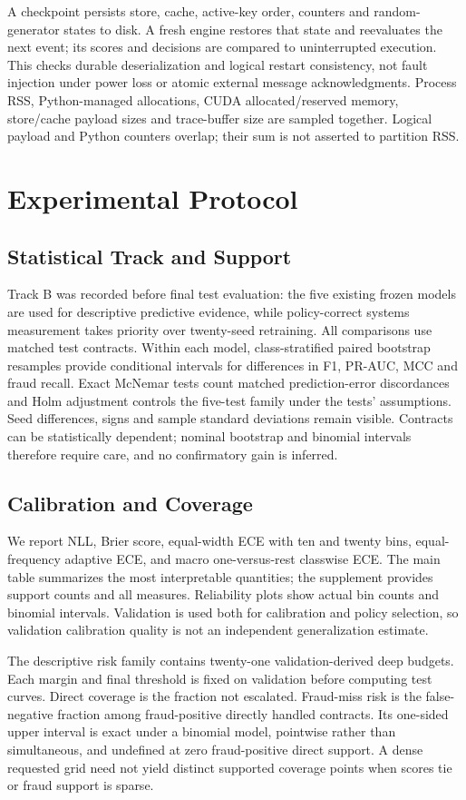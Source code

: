 \documentclass[10pt,journal]{IEEEtran}
\begin{document}
A checkpoint persists store, cache, active-key order, counters and random-generator states to disk. A fresh engine restores that state and reevaluates the next event; its scores and decisions are compared to uninterrupted execution. This checks durable deserialization and logical restart consistency, not fault injection under power loss or atomic external message acknowledgments. Process RSS, Python-managed allocations, CUDA allocated/reserved memory, store/cache payload sizes and trace-buffer size are sampled together. Logical payload and Python counters overlap; their sum is not asserted to partition RSS.

\section{Experimental Protocol}
\subsection{Statistical Track and Support}
Track B was recorded before final test evaluation: the five existing frozen models are used for descriptive predictive evidence, while policy-correct systems measurement takes priority over twenty-seed retraining. All comparisons use matched test contracts. Within each model, class-stratified paired bootstrap resamples provide conditional intervals for differences in F1, PR-AUC, MCC and fraud recall. Exact McNemar tests count matched prediction-error discordances and Holm adjustment controls the five-test family under the tests' assumptions. Seed differences, signs and sample standard deviations remain visible. Contracts can be statistically dependent; nominal bootstrap and binomial intervals therefore require care, and no confirmatory gain is inferred.

\subsection{Calibration and Coverage}
We report NLL, Brier score, equal-width ECE with ten and twenty bins, equal-frequency adaptive ECE, and macro one-versus-rest classwise ECE. The main table summarizes the most interpretable quantities; the supplement provides support counts and all measures. Reliability plots show actual bin counts and binomial intervals. Validation is used both for calibration and policy selection, so validation calibration quality is not an independent generalization estimate.

The descriptive risk family contains twenty-one validation-derived deep budgets. Each margin and final threshold is fixed on validation before computing test curves. Direct coverage is the fraction not escalated. Fraud-miss risk is the false-negative fraction among fraud-positive directly handled contracts. Its one-sided upper interval is exact under a binomial model, pointwise rather than simultaneous, and undefined at zero fraud-positive direct support. A dense requested grid need not yield distinct supported coverage points when scores tie or fraud support is sparse.
\end{document}
